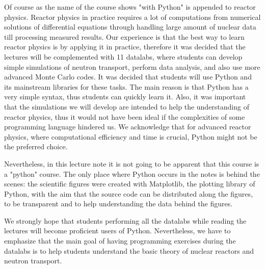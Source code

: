 Of course as the name of the course shows "with Python" is appended to reactor physics. Reactor physics in practice requires a lot of computations from numerical solutions of differential equations through handling large amount of nuclear data till processing measured results. Our experience is that the best way to learn reactor physics is by applying it in practice, therefore it was decided that the lectures will be complemented with 11 datalabs, where students can develop simple simulations of neutron transport, perform data analysis, and also use more advanced Monte Carlo codes. It was decided that students will use Python and its mainstream libraries for these tasks. The main reason is that Python has a very simple syntax, thus students can quickly learn it. Also, it was important that the simulations we will develop are intended to help the understanding of reactor physics, thus it would not have been ideal if the complexities of some programming language hindered us. We acknowledge that for advanced reactor physics, where computational efficiency and time is crucial, Python might not be the preferred choice.

Nevertheless, in this lecture note it is not going to be apparent that this course is a "python" course. The only place where Python occurs in the notes is behind the scenes: the scientific figures were created with Matplotlib, the plotting library of Python, with the aim that the source code can be distributed along the figures, to be transparent and to help understanding the data behind the figures. 

We strongly hope that students performing all the datalabs while reading the lectures will become proficient users of Python. Nevertheless, we have to emphasize that the main goal of having programming exercises during the datalabs is to help students understand the basic theory of nuclear reactors and neutron transport.

%